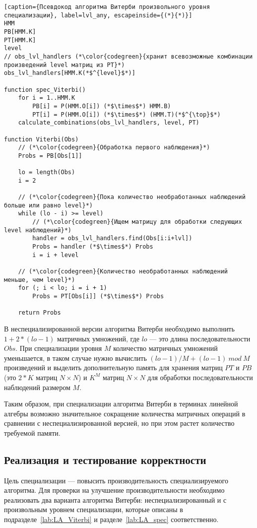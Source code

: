 \begin{lstlisting}[caption={Псевдокод алгоритма Витерби произвольного уровня специализации}, label=lvl_any, escapeinside={(*}{*)}]
HMM
PB[HMM.K]
PT[HMM.K]
level
// obs_lvl_handlers (*\color{codegreen}{хранит всевозможные комбинации произведений level матриц из PT}*)
obs_lvl_handlers[HMM.K(*$^{level}$*)]

function spec_Viterbi()
	for i = 1..HMM.K
		PB[i] = P(HMM.O[i]) (*$\times$*) HMM.B)
		PT[i] = P(HMM.O[i]) (*$\times$*) (HMM.T)(*$^{\top}$*)
	calculate_combinations(obs_lvl_handlers, level, PT)

function Viterbi(Obs)
	// (*\color{codegreen}{Обработка первого наблюдения}*)
	Probs = PB[Obs[1]]

	lo = length(Obs)
	i = 2

	// (*\color{codegreen}{Пока количество необработанных наблюдений больше или равно level}*)
	while (lo - i) >= level)
		// (*\color{codegreen}{Ищем матрицу для обработки следующих level наблюдений}*)
		handler = obs_lvl_handlers.find(Obs[i:i+lvl])
		Probs = handler (*$\times$*) Probs
		i = i + level
	
	// (*\color{codegreen}{Количество необработанных наблюдений меньше, чем level}*)
	for (; i < lo; i = i + 1)
		Probs = PT[Obs[i]] (*$\times$*) Probs

	return Probs
\end{lstlisting}
В неспециализированной версии алгоритма Витерби необходимо 
выполнить $1 + 2 * (lo - 1)$ матричных умножений, где $lo$ 
--- это длина последовательности $Obs$.
При специализации уровня $M$ количество 
матричных умножений уменьшается, в таком случае нужно 
вычислить $\mathit{(lo - 1) / M + (lo - 1)\ mod\ M}$ 
произведений и выделить дополнительную память для хранения 
матриц $PT$ и $PB$ (это $2 * K$ матриц $N \times N$) и $K^{M}$ матриц $N 
\times N$ для обработки последовательности наблюдений 
размером $M$.

Таким образом, при специализации алгоритма Витерби в 
терминах линейной алгебры возможно значительное сокращение 
количества матричных операций в сравнении с 
неспециализированной версией, но при этом растет количество 
требуемой памяти.

\subsection{Реализация и тестирование  корректности}
Цель специализации --- повысить производительность 
специализируемого алгоритма.
Для проверки на улучшение производительности необходимо 
реализовать два варианта алгоритма Витерби: 
неспециализированный и с произвольным уровнем специализации, 
которые описаны в подразделе~\ref{lab:LA_Viterbi} 
и разделе~\ref{lab:LA_spec} соответственно.

